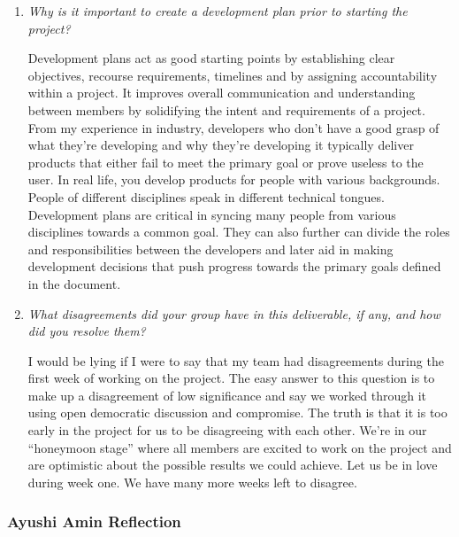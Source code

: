 \documentclass{article}
\begin{document}
\begin{enumerate}
  \item \textit{Why is it important to create a development plan prior to starting the project?}

    Development plans act as good starting points by establishing clear objectives, recourse requirements, timelines and by 
    assigning accountability within a project. It improves overall communication and understanding between members by solidifying 
    the intent and requirements of a project. From my experience in industry, developers who don’t have a good grasp of what they’re 
    developing and why they’re developing it typically deliver products that either fail to meet the primary goal or prove useless to 
    the user. In real life, you develop products for people with various backgrounds. People of different disciplines speak in different 
    technical tongues. Development plans are critical in syncing many people from various disciplines towards a common goal. They can also 
    further can divide the roles and responsibilities between the developers and later aid in making development decisions that push 
    progress towards the primary goals defined in the document.
    
  \item \textit{What disagreements did your group have in this deliverable, if any, and how did you resolve them?}

    I would be lying if I were to say that my team had disagreements during the first week of working on the project. The easy answer to 
    this question is to make up a disagreement of low significance and say we worked through it using open democratic discussion and 
    compromise. The truth is that it is too early in the project for us to be disagreeing with each other. We’re in our “honeymoon stage” 
    where all members are excited to work on the project and are optimistic about the possible results we could achieve. Let us be in love 
    during week one. We have many more weeks left to disagree.
    
\end{enumerate}

\subsubsection*{Ayushi Amin Reflection}
\end{document}
